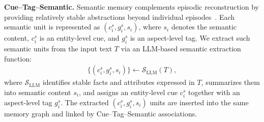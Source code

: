 \documentclass{llmxive}
\begin{document}
\textbf{Cue--Tag--Semantic.}
Semantic memory complements episodic reconstruction by providing relatively stable abstractions beyond individual episodes~\cite{anokhin2024arigraph,hu2025memory}.
Each semantic unit is represented as $(c^s_i, g^s_i, s_i)$, where $s_i$ denotes the semantic content, $c^s_i$ is an entity-level cue, and $g^s_i$ is an aspect-level tag.
We extract such semantic units from the input text $T$ via an LLM-based semantic extraction function:
\begin{align}
\{(c^s_i, g^s_i, s_i)\} \leftarrow \mathcal{S}_{\text{LLM}}(T),
\end{align}
where $\mathcal{S}_{\text{LLM}}$ identifies stable facts and attributes expressed in $T$, summarizes them into semantic content $s_i$,
and assigns an entity-level cue $c^s_i$ together with an aspect-level tag $g^s_i$.
The extracted $(c^s_i, g^s_i, s_i)$ units are inserted into the same memory graph and linked by Cue--Tag--Semantic associations.
\end{document}
